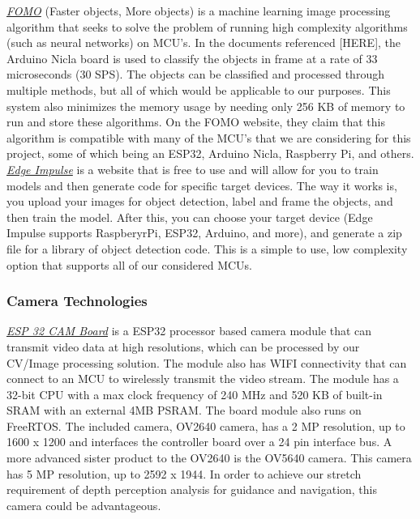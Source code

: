 \noindent \underline{\textit{FOMO}} (Faster objects, More objects) is a machine learning image processing algorithm that seeks to solve the problem of running high complexity algorithms (such as neural networks) on MCU's. In the documents referenced [HERE], the Arduino Nicla board is used to classify the objects in frame at a rate of 33 microseconds (30 SPS). The objects can be classified and processed through multiple methods, but all of which would be applicable to our purposes. This system also minimizes the memory usage by needing only 256 KB of memory to run and store these algorithms. On the FOMO website, they claim that this algorithm is compatible with many of the MCU's that we are considering for this project, some of which being an ESP32, Arduino Nicla, Raspberry Pi, and others. \\

\noindent \underline{\textit{Edge Impulse}} is a website that is free to use and will allow for you to train models and then generate code for specific target devices. The way it works is, you upload your images for object detection, label and frame the objects, and then train the model. After this, you can choose your target device (Edge Impulse supports RaspberyrPi, ESP32, Arduino, and more), and generate a zip file for a library of object detection code. This is a simple to use, low complexity option that supports all of our considered MCUs.\\

\subsubsection{Camera Technologies}
\label{sec:cam_tech}
\noindent \underline{\textit{ESP 32 CAM Board}} is a ESP32 processor based camera module that can transmit video data at high resolutions, which can be processed by our CV/Image processing solution. The module also has WIFI connectivity that can connect to an MCU to wirelessly transmit the video stream. The module has a 32-bit CPU with a max clock frequency of 240 MHz and 520 KB of built-in SRAM with an external 4MB PSRAM. The board module also runs on FreeRTOS. The included camera, OV2640 camera, has a 2 MP resolution, up to 1600 x 1200 and interfaces the controller board over a 24 pin interface bus. A more advanced sister product to the OV2640 is the OV5640 camera. This camera has 5 MP resolution, up to 2592 x 1944. In order to achieve our stretch requirement of depth perception analysis for guidance and navigation, this camera could be advantageous.\\

